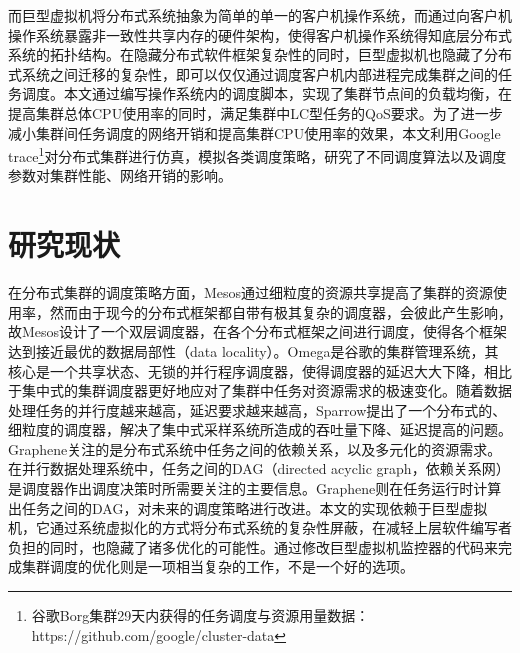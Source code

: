 而巨型虚拟机将分布式系统抽象为简单的单一的客户机操作系统，而通过向客户机操作系统暴露非一致性共享内存的硬件架构，使得客户机操作系统得知底层分布式系统的拓扑结构。在隐藏分布式软件框架复杂性的同时，巨型虚拟机也隐藏了分布式系统之间迁移的复杂性，即可以仅仅通过调度客户机内部进程完成集群之间的任务调度。本文通过编写操作系统内的调度脚本，实现了集群节点间的负载均衡，在提高集群总体CPU使用率的同时，满足集群中LC型任务的QoS要求。为了进一步减小集群间任务调度的网络开销和提高集群CPU使用率的效果，本文利用Google trace\footnote{谷歌Borg集群29天内获得的任务调度与资源用量数据：https://github.com/google/cluster-data}对分布式集群进行仿真，模拟各类调度策略，研究了不同调度算法以及调度参数对集群性能、网络开销的影响。

\section{研究现状}
在分布式集群的调度策略方面，Mesos\cite{mesos}通过细粒度的资源共享提高了集群的资源使用率，然而由于现今的分布式框架都自带有极其复杂的调度器，会彼此产生影响，故Mesos设计了一个双层调度器，在各个分布式框架之间进行调度，使得各个框架达到接近最优的数据局部性（data locality）。Omega\cite{omega}是谷歌的集群管理系统，其核心是一个共享状态、无锁的并行程序调度器，使得调度器的延迟大大下降，相比于集中式的集群调度器更好地应对了集群中任务对资源需求的极速变化。随着数据处理任务的并行度越来越高，延迟要求越来越高，Sparrow\cite{sparrow}提出了一个分布式的、细粒度的调度器，解决了集中式采样系统所造成的吞吐量下降、延迟提高的问题。Graphene\cite{graphene}关注的是分布式系统中任务之间的依赖关系，以及多元化的资源需求。在并行数据处理系统中，任务之间的DAG（directed acyclic graph，依赖关系网）是调度器作出调度决策时所需要关注的主要信息。Graphene则在任务运行时计算出任务之间的DAG，对未来的调度策略进行改进。本文的实现依赖于巨型虚拟机，它通过系统虚拟化的方式将分布式系统的复杂性屏蔽，在减轻上层软件编写者负担的同时，也隐藏了诸多优化的可能性。通过修改巨型虚拟机监控器的代码来完成集群调度的优化则是一项相当复杂的工作，不是一个好的选项。

